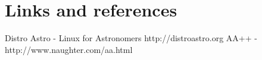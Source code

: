 \section{Links and references}

Distro Astro - Linux for Astronomers http://distroastro.org
AA++ - http://www.naughter.com/aa.html